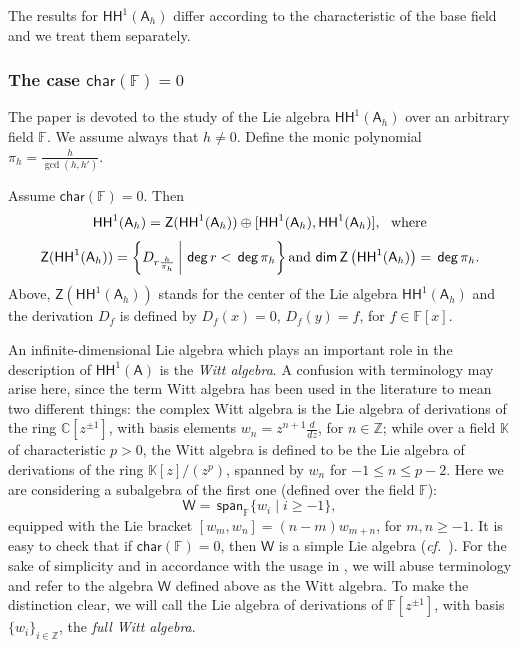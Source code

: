 \documentclass{commat}
\newcommand{\FF}{\mathbb{F}}
\newcommand{\ZZ}{\mathbb{Z}}
\newcommand{\CC}{\mathbb{C}}
\newcommand{\KK}{\mathbb{K}}
\newcommand{\A}{\mathsf{A}}
\newcommand{\W}{\mathsf{W}}
\newcommand\chara{\mathsf {char}}
\newcommand\hoch{\mathsf{HH}}
\newcommand\degg{\, \mathsf{deg} \,}
\newcommand\dimm{\, \mathsf{dim}\,}
\newcommand\spann{\, \mathsf{span}}
\newcommand{\lb}[1]{\left[ #1\right]}
\begin{document}
The results for $\hoch^1(\A_h)$ differ according to the characteristic of the base field and we treat them separately.

\subsubsection{The case \texorpdfstring{$\chara(\FF)=0$}{char(F)=0}}\label{SSS:hh1:char0}

The paper \cite{BLO15ja} is devoted to the study of the Lie algebra $\hoch^1(\A_h)$ over an arbitrary field $\FF$. We assume always that $h\neq 0$. Define the monic polynomial $\pi_{h}= \frac{h}{\gcd (h, h')}$.

\begin{theorem}\label{thm:hochdec}
	Assume $\chara (\FF)=0$.  Then 
	\begin{equation*}%
		\hoch^1(\A_{h})=\mathsf{Z}(\hoch^1 (\A_h))\oplus [\hoch^1 (\A_h), \hoch^1 (\A_h)], \ \ \hbox{\rm where}  \end{equation*}
	\begin{equation*}%
		\mathsf{Z}(\hoch^1 (\A_h))=\bigg\{ D_{r\frac{h}{\pi_h}}\,\bigg | \,\degg r <\degg \pi_{h} \bigg\}  \, \hbox{\rm  and} \,
		\dimm \mathsf{Z}\left(\hoch^1 (\A_h)\right) = \degg \pi_{h}.
	\end{equation*}
	Above, $\mathsf{Z}(\hoch^1 (\A_h))$ stands for the center of the Lie algebra $\hoch^1 (\A_h)$ and the derivation $D_f$ is defined by $D_f(x)=0$, $D_f(y)=f$, for $f\in\FF[x]$.
\end{theorem}

An infinite-dimensional Lie algebra which plays an important role in the description of $\hoch^1(\A)$ is the \textit{Witt algebra}. A confusion with terminology may arise here, since the term Witt algebra has been used in the literature to mean two different things: the complex Witt algebra is the Lie algebra of derivations of the ring $\CC[z^{\pm 1}]$, with basis elements $w_n=z^{n+1}\frac{d}{dz}$, for $n\in\ZZ$;
while over a field $\KK$ of characteristic $p>0$, the Witt algebra is defined to be the Lie algebra of derivations of the ring
$\KK[z]/(z^p)$, spanned by $w_n$ for $-1\le n \le p-2$. 
Here we are considering a subalgebra of the first one (defined over the field $\FF$): 
\begin{equation}\label{E:def:Witt}
	\W = \spann_\FF\{w_i \mid i \geq -1\}, 
\end{equation}
equipped with the Lie bracket $\lb{w_m, w_n}=(n-m)w_{m+n}$, for $m, n\geq -1$. It is easy to check that if $\chara(\FF)=0$, then $\W$ is a simple Lie algebra (\textit{cf.}\ \cite[Lem.\ 5.19]{BLO15ja}). For the sake of simplicity and in accordance with the usage in \cite{BLO15ja}, we will abuse terminology and refer to the algebra $\W$ defined above as the Witt algebra. To make the distinction clear, we will call the Lie algebra of derivations of $\FF[z^{\pm 1}]$, with basis $\{w_i\}_{i \in\ZZ}$, the \textit{full Witt algebra}.
\end{document}
